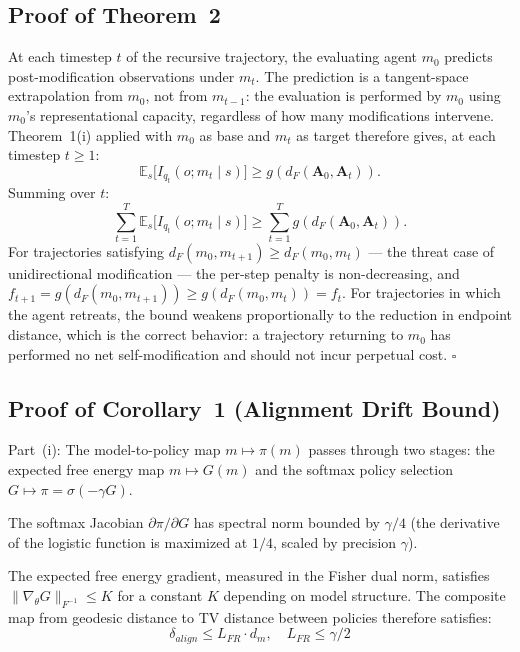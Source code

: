 \documentclass[runningheads]{llncs}
\begin{document}
\subsection{Proof of Theorem~2}

At each timestep $t$ of the recursive trajectory, the evaluating agent $m_0$ predicts post-modification observations under $m_t$. The prediction is a tangent-space extrapolation from $m_0$, not from $m_{t-1}$: the evaluation is performed by $m_0$ using $m_0$'s representational capacity, regardless of how many modifications intervene. Theorem~1(i) applied with $m_0$ as base and $m_t$ as target therefore gives, at each timestep $t \geq 1$:
\begin{equation}
\mathbb{E}_s\bigl[I_{q_t}(o; m_t \mid s)\bigr] \geq g(d_F(\mathbf{A}_0, \mathbf{A}_t)).
\end{equation}
Summing over $t$:
\begin{equation}
\sum_{t=1}^T \mathbb{E}_s\bigl[I_{q_t}(o; m_t \mid s)\bigr] \geq \sum_{t=1}^T g(d_F(\mathbf{A}_0, \mathbf{A}_t)).
\end{equation}
For trajectories satisfying $d_F(m_0, m_{t+1}) \geq d_F(m_0, m_t)$ --- the threat case of unidirectional modification --- the per-step penalty is non-decreasing, and $f_{t+1} = g(d_F(m_0, m_{t+1})) \geq g(d_F(m_0, m_t)) = f_t$. For trajectories in which the agent retreats, the bound weakens proportionally to the reduction in endpoint distance, which is the correct behavior: a trajectory returning to $m_0$ has performed no net self-modification and should not incur perpetual cost. $\square$

\subsection{Proof of Corollary~1 (Alignment Drift Bound)}

Part~(i): The model-to-policy map $m \mapsto \pi(m)$ passes through two stages: the expected free energy map $m \mapsto G(m)$ and the softmax policy selection $G \mapsto \pi = \sigma(-\gamma G)$.

The softmax Jacobian $\partial\pi/\partial G$ has spectral norm bounded by $\gamma/4$ (the derivative of the logistic function is maximized at $1/4$, scaled by precision $\gamma$).

The expected free energy gradient, measured in the Fisher dual norm, satisfies $\|\nabla_\theta G\|_{F^{-1}} \leq K$ for a constant $K$ depending on model structure. The composite map from geodesic distance to TV distance between policies therefore satisfies:
\begin{equation}
\delta_{align} \leq L_{FR} \cdot d_m, \quad L_{FR} \leq \gamma/2
\end{equation}
\end{document}
